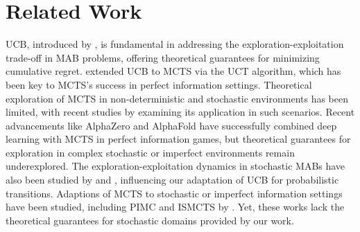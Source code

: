 \section{Related Work}
UCB, introduced by \citet{auer2002finite}, is fundamental in addressing the exploration-exploitation trade-off in MAB problems, offering theoretical guarantees for minimizing cumulative regret. \citet{kocsis2006bandit} extended UCB to MCTS via the UCT algorithm, which has been key to MCTS's success in perfect information settings. Theoretical exploration of MCTS in non-deterministic and stochastic environments has been limited, with recent studies by \citet{dampower} examining its application in such scenarios.
\newpage
Recent advancements like AlphaZero \citep{silver2017mastering, silver2018general} and AlphaFold \cite{alphafold} have successfully combined deep learning with MCTS in perfect information games, but theoretical guarantees for exploration in complex stochastic or imperfect environments remain underexplored. 
The exploration-exploitation dynamics in stochastic MABs have also been studied by \citet{audibert2009exploration} and \citet{BubeckC12}, influencing our adaptation of UCB for probabilistic transitions. Adaptions of MCTS to stochastic or imperfect information settings have been studied, including PIMC \cite{ginsberg2001gib,long2010understanding} and ISMCTS by \citet{cowling2012information}. Yet, these works lack the theoretical guarantees for stochastic domains provided by our work.

%